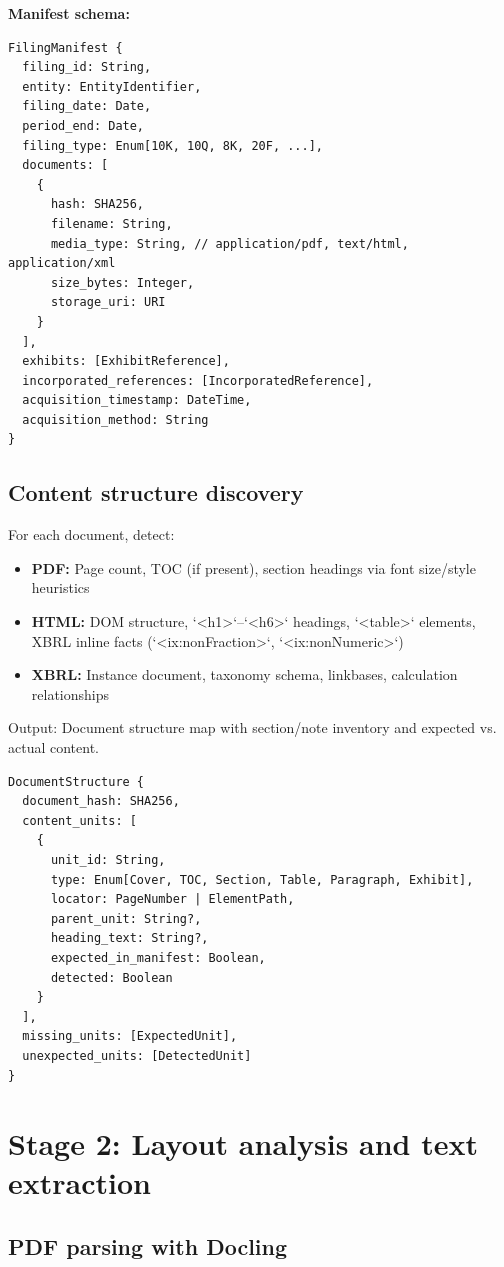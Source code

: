 \textbf{Manifest schema:}

\begin{lstlisting}
FilingManifest {
  filing_id: String,
  entity: EntityIdentifier,
  filing_date: Date,
  period_end: Date,
  filing_type: Enum[10K, 10Q, 8K, 20F, ...],
  documents: [
    {
      hash: SHA256,
      filename: String,
      media_type: String, // application/pdf, text/html, application/xml
      size_bytes: Integer,
      storage_uri: URI
    }
  ],
  exhibits: [ExhibitReference],
  incorporated_references: [IncorporatedReference],
  acquisition_timestamp: DateTime,
  acquisition_method: String
}
\end{lstlisting}

\subsection{Content structure discovery}

For each document, detect:
\begin{itemize}
\item \textbf{PDF:} Page count, TOC (if present), section headings via font size/style heuristics
\item \textbf{HTML:} DOM structure, `<h1>`--`<h6>` headings, `<table>` elements,
  XBRL inline facts (`<ix:nonFraction>`, `<ix:nonNumeric>`)
\item \textbf{XBRL:} Instance document, taxonomy schema, linkbases, calculation relationships
\end{itemize}

Output: Document structure map with section/note inventory and expected vs. actual content.

\begin{lstlisting}
DocumentStructure {
  document_hash: SHA256,
  content_units: [
    {
      unit_id: String,
      type: Enum[Cover, TOC, Section, Table, Paragraph, Exhibit],
      locator: PageNumber | ElementPath,
      parent_unit: String?,
      heading_text: String?,
      expected_in_manifest: Boolean,
      detected: Boolean
    }
  ],
  missing_units: [ExpectedUnit],
  unexpected_units: [DetectedUnit]
}
\end{lstlisting}

\section{Stage 2: Layout analysis and text extraction}

\subsection{PDF parsing with Docling}

